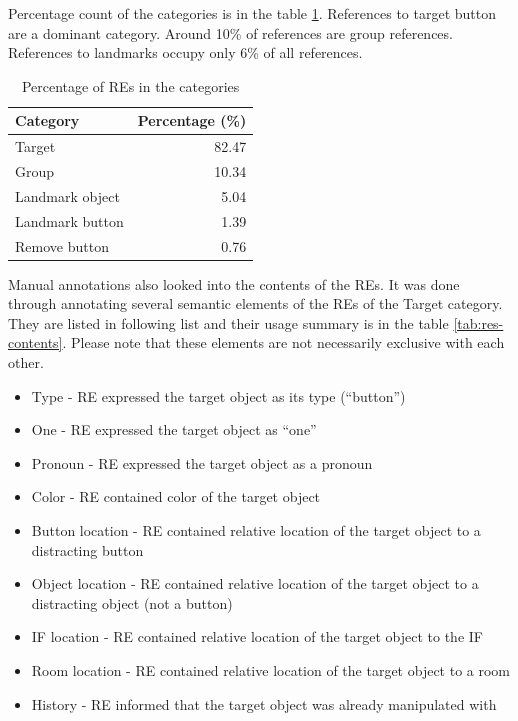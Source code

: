 Percentage count of the categories is in the table \ref{tab:res-groups}. References to target button are a dominant category. Around 10\% of references are group references. References to landmarks occupy only 6\% of all references.

\begin{table}[h!]
\centering
\begin{tabular}{lr}
\toprule
Category  & Percentage (\%)  \\
\midrule
Target   		& 82.47\\
Group 			& 10.34\\
Landmark object 	& 5.04\\
Landmark button	& 1.39\\
Remove button 	& 0.76\\
\bottomrule
\end{tabular}
\caption{Percentage of REs in the categories}
\label{tab:res-groups}
\end{table} 

Manual annotations also looked into the contents of the REs. It was done through annotating several semantic elements of the REs of the Target category. They are listed in following list and their usage summary is in the table \ref{tab:res-contents}. Please note that these elements are not necessarily exclusive with each other.

\begin{itemize}
\item
Type - RE expressed the target object as its type (``button'')
\item
One - RE expressed the target object as ``one''
\item
Pronoun - RE expressed the target object as a pronoun
\item
Color -  RE contained color of the target object
\item
Button location - RE contained relative location of the target object to a distracting button
\item
Object location - RE contained relative location of the target object to a distracting object (not a button)
\item 
IF location - RE contained relative location of the target object to the IF
\item
Room location - RE contained relative location of the target object to a room
\item
History - RE informed that the target object was already manipulated with
\end{itemize}

